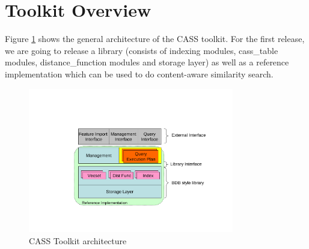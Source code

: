 %       
% 
% 
% 
\section {Toolkit Overview}

Figure \ref{fig:arch} shows the general architecture of the CASS toolkit.
For the first release, we are going to release a library (consists of
indexing modules, cass\_table modules, distance\_function modules
 and storage layer) as well
as a reference implementation which can be used to do content-aware
similarity search.

\begin{figure}[ht!]
\includegraphics[clip=true,trim=1in 0.6in 0.1in 1.7in, width=0.8\textwidth]{cass_arch}
\caption{CASS Toolkit architecture}
\label{fig:arch}
\end{figure}

